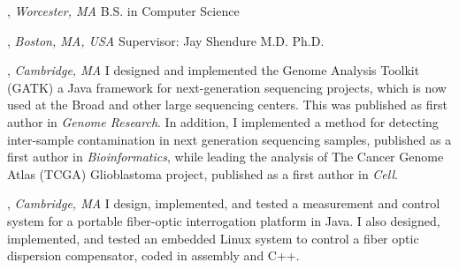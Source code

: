 \documentclass[9pt]{article}
\begin{document}
\bigskip

, \emph{Worcester, MA} \vspace{0.01in}  
\newline\noindent B.S. in Computer Science

\bigskip


\medskip
{}

, \emph{Boston, MA, USA} \vspace{0.01in} 
\newline{}
\newline\noindent Supervisor: Jay Shendure M.D. Ph.D.
\bigskip

, \emph{Cambridge, MA} \vspace{0.01in} 
\newline{}
\newline
\newline\noindent I designed and implemented the Genome Analysis Toolkit (GATK) a Java framework for next-generation sequencing projects, which is now used at the Broad and other large sequencing centers.  This was published as first author in \textit{Genome Research}. In addition, I implemented a method for detecting inter-sample contamination in next generation sequencing samples, published as a first author in \textit{Bioinformatics}, while leading the analysis of The Cancer Genome Atlas (TCGA) Glioblastoma project, published as a first author in \textit{Cell}.

\bigskip

, \emph{Cambridge, MA} \vspace{0.01in} 
\newline{}
\newline
\newline\noindent I design, implemented, and tested a measurement and control system for a portable fiber-optic interrogation platform in Java. I also designed, implemented, and tested an embedded Linux system to control a fiber optic dispersion compensator, coded in assembly and C++. 
\bigskip
\end{document}
